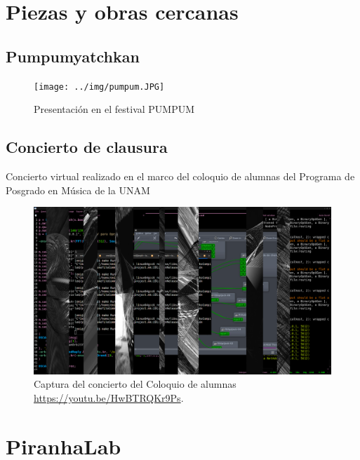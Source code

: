 \section{Piezas y obras cercanas} %

\subsection{Pumpumyatchkan}

\begin{figure}[tb]
\centering 
\texttt{[image: ../img/pumpum.JPG]} 
\caption[Concierto PUMPUM]{Presentación en el festival PUMPUM} %
\label{fig:gallery} 
\end{figure}

\subsection{Concierto de clausura} %

Concierto virtual realizado en el marco del coloquio de alumnas del Programa de Posgrado en Música de la UNAM

\begin{figure}[tb]
\centering 
\includegraphics[width=\columnwidth]{../img/col2.png} 
\caption[Concierto coloquio]{Captura del concierto del Coloquio de alumnas \url{https://youtu.be/HwBTRQKr9Ps}.} %
\label{fig:gallery} 
\end{figure}

\section{PiranhaLab}

